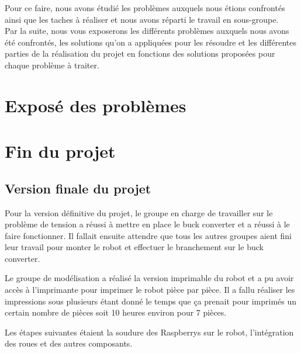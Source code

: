 \documentclass{PackagerQualityN}
\begin{document}
Pour ce faire, nous avons étudié les problèmes auxquels nous étions confrontés ainsi que les taches à réaliser et nous avons réparti le travail en sous-groupe.\\

Par la suite, nous vous exposerons les différents problèmes auxquels nous avons été confrontés, les solutions qu’on a appliquées pour les résoudre et les différentes parties de la réalisation du projet en fonctions des solutions proposées pour chaque problème à traiter.\\

\newp


\section{Exposé des problèmes}



\newp




\newp
\section{Fin du projet}

\subsection{Version finale du projet}
Pour la version définitive du projet, le groupe en charge de travailler sur le problème de tension a réussi à mettre en place le buck converter et a réussi à le faire fonctionner. Il fallait ensuite attendre que tous les autres groupes aient fini leur travail pour monter le robot et effectuer le branchement sur le buck converter.\\


Le groupe de modélisation a réalisé la version imprimable du robot et a pu avoir accès à l'imprimante pour imprimer le robot pièce par pièce. Il a fallu réaliser les impressions sous plusieurs étant donné le temps que ça prenait pour imprimés un certain nombre de pièces soit 10 heures environ pour 7 pièces.


Les étapes suivantes étaient la soudure des Raspberrys sur le robot, l'intégration des roues et des autres composants.
\end{document}
